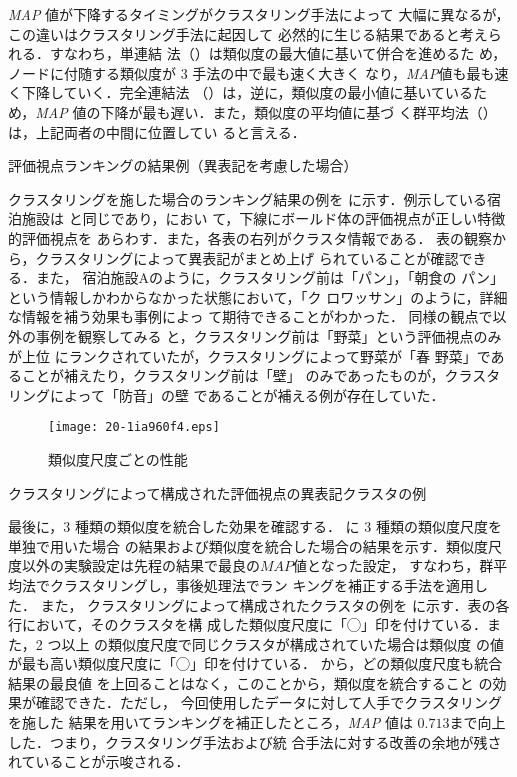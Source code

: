 \documentclass[japanese]{jnlp_1.4}
\def\eq#1{}
\def\fig#1{}
\def\tab#1{}
\begin{document}
\textit{MAP} 値が下降するタイミングがクラスタリング手法によって
大幅に異なるが，この違いはクラスタリング手法に起因して
必然的に生じる結果であると考えられる．すなわち，単連結
法（\eq{single}）は類似度の最大値に基いて併合を進めるた
め，ノードに付随する類似度が 3 手法の中で最も速く大きく
なり，\textit{MAP}値も最も速く下降していく．完全連結法
（\eq{complete}）は，逆に，類似度の最小値に基いているた
め，\textit{MAP} 値の下降が最も遅い．また，類似度の平均値に基づ
く群平均法（\eq{group}）は，上記両者の中間に位置してい
ると言える．


\begin{table}[b]
\caption{評価視点ランキングの結果例（異表記を考慮した場合）}
\label{tab:ranking_top2}

\end{table}

クラスタリングを施した場合のランキング結果の例を
\tab{ranking_top2}に示す．例示している宿泊施設は
\tab{ranking_top}と同じであり，\tab{ranking_top2}におい
て，下線にボールド体の評価視点が正しい特徴的評価視点を
あらわす．また，各表の右列がクラスタ情報である．
表の観察から，クラスタリングによって異表記がまとめ上げ
られていることが確認できる．また，
宿泊施設Aのように，クラスタリング前は「パン」，「朝食の
  パン」という情報しかわからなかった状態において，「ク
  ロワッサン」のように，詳細な情報を補う効果も事例によっ
て期待できることがわかった．
同様の観点で\tab{ranking_top2}以外の事例を観察してみる
と，クラスタリング前は「野菜」という評価視点のみが上位
にランクされていたが，クラスタリングによって野菜が「春
  野菜」であることが補えたり，クラスタリング前は「壁」
のみであったものが，クラスタリングによって「防音」の壁
であることが補える例が存在していた．


\begin{figure}[b]
 \begin{center}
 \texttt{[image: 20-1ia960f4.eps]}
 \end{center}
 \caption{類似度尺度ごとの性能}
 \label{fig:ranking_sim}
\end{figure}
\begin{table}[b]
 \caption{クラスタリングによって構成された評価視点の異表記クラスタの例}
 \label{tab:cluster}

\end{table}

最後に，3 種類の類似度を統合した効果を確認する．
\fig{ranking_sim}に 3 種類の類似度尺度を単独で用いた場合
の結果および類似度を統合した場合の結果を示す．類似度尺
度以外の実験設定は先程の結果で最良の$MAP$値となった設定，
すなわち，群平均法でクラスタリングし，事後処理法でラン
キングを補正する手法を適用した．
また，
クラスタリングによって構成されたクラスタの例を
\tab{cluster}に示す．表の各行において，そのクラスタを構
成した類似度尺度に「◯」印を付けている．また，2 つ以上
の類似度尺度で同じクラスタが構成されていた場合は類似度
の値が最も高い類似度尺度に「◯」印を付けている．
\fig{ranking_sim}から，どの類似度尺度も統合結果の最良値
を上回ることはなく，このことから，類似度を統合すること
の効果が確認できた．ただし，
今回使用したデータに対して人手でクラスタリングを施した
結果を用いてランキングを補正したところ，\textit{MAP} 値は
$0.713$まで向上した．つまり，クラスタリング手法および統
合手法に対する改善の余地が残されていることが示唆される．
\end{document}
